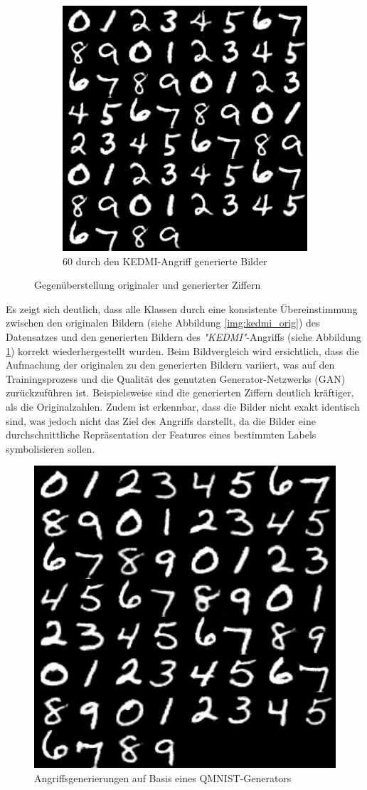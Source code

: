 \begin{figure}[H]
\begin{subfigure}[b]{0.348\linewidth}
		\includegraphics[width=\linewidth]{Bilder/kedmi_mnist.png}
		\caption{60 durch den \glqq KEDMI\grqq-Angriff generierte Bilder}
		\label{img:kedmi_gen}
	\end{subfigure}
	\caption{Gegenüberstellung originaler und generierter Ziffern}
	\label{img:kedmi_visual}
\end{figure}

Es zeigt sich deutlich, dass alle Klassen durch eine konsistente Übereinstimmung zwischen den originalen Bildern (siehe Abbildung \ref{img:kedmi_orig}) des Datensatzes und den generierten Bildern des \textit{"KEDMI"}-Angriffs (siehe Abbildung \ref{img:kedmi_gen}) korrekt wiederhergestellt wurden. Beim Bildvergleich wird ersichtlich, dass die Aufmachung der originalen zu den generierten Bildern variiert, was auf den Trainingsprozess und die Qualität des genutzten Generator-Netzwerks (GAN) zurückzuführen ist. Beispielsweise sind die generierten Ziffern deutlich kräftiger, als die Originalzahlen. Zudem ist erkennbar, dass die Bilder nicht exakt identisch sind, was jedoch nicht das Ziel des Angriffs darstellt, da die Bilder eine durchschnittliche Repräsentation der Features eines bestimmten Labels symbolisieren sollen.

\begin{figure}[H]
	\centering
	\includegraphics[width=0.35\linewidth]{Bilder/qmnist.png}
	\caption{Angriffsgenerierungen auf Basis eines QMNIST-Generators}
	\label{img:kedmi_qmnist}
\end{figure}

